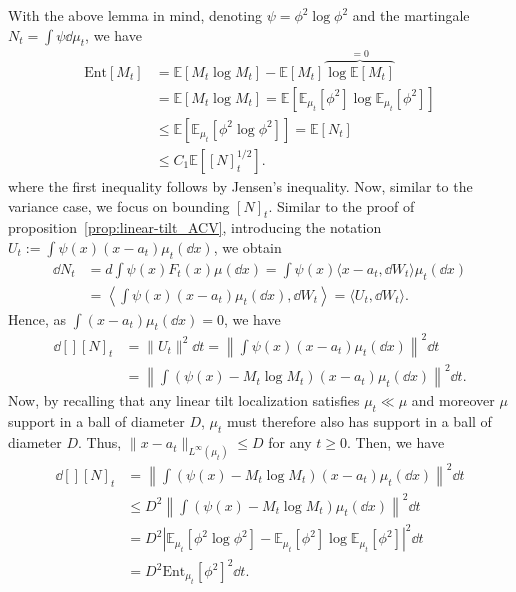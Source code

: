 With the above lemma in mind, denoting \(\psi = \phi^2 \log \phi^2\) and the martingale \(N_t = \int \psi \dd \mu_t\),
we have 
\begin{equation}\label{eq:entropy_bound}
  \begin{split}
    \text{Ent}[M_t] & = \mathbb{E}[M_t\log M_t] - \mathbb{E}[M_t]\overbrace{\log\mathbb{E}[M_t]}^{= 0}\\ 
      & = \mathbb{E}[M_t\log M_t] = \mathbb{E}[\mathbb{E}_{\mu_t}[\phi^2] \log\mathbb{E}_{\mu_t}[\phi^2]]\\
      & \le \mathbb{E}[\mathbb{E}_{\mu_t}[\phi^2 \log \phi^2]] = \mathbb{E}[N_t]\\ 
      & \le C_1 \mathbb{E}\left[[N]_t^{1 / 2}\right].
  \end{split}
\end{equation}
where the first inequality follows by Jensen's inequality. Now, similar to the variance case, we focus on 
bounding \([N]_t\). Similar to the proof of proposition~\ref{prop:linear-tilt_ACV}, introducing the notation  
\(U_t := \int \psi(x)(x - a_t)\mu_t(\dd x)\), we obtain
\begin{align*}
  \dd N_t & = d \int \psi(x) F_t(x) \mu(\dd x) = \int \psi(x) \langle x - a_t, \dd W_t \rangle \mu_t(\dd x)\\
  & = \left\langle \int \psi(x)(x - a_t)\mu_t(\dd x), \dd W_t\right\rangle = \langle U_t, \dd W_t\rangle.
\end{align*}
Hence, as \(\int (x - a_t) \mu_t(\dd x) = 0\), we have
\begin{align*}
  \dd[] [N]_t & = \|U_t\|^2 \dd t = \left\|\int \psi(x)(x - a_t)\mu_t(\dd x)\right\|^2 \dd t\\
  & = \left\|\int (\psi(x) - M_t \log M_t)(x - a_t)\mu_t(\dd x)\right\|^2 \dd t.
\end{align*}
Now, by recalling that any linear tilt localization satisfies \(\mu_t \ll \mu\) and moreover 
\(\mu\) support in a ball of diameter \(D\), \(\mu_t\) must therefore also has support in a ball of diameter \(D\). 
Thus, \(\|x - a_t\|_{L^\infty(\mu_t)} \le D\) for any \(t \ge 0\). Then, we have  
\begin{align*}
  \dd[] [N]_t & = \left\|\int (\psi(x) - M_t \log M_t)(x - a_t)\mu_t(\dd x)\right\|^2 \dd t\\
  & \le D^2 \left\|\int (\psi(x) - M_t \log M_t)\mu_t(\dd x)\right\|^2 \dd t\\
  & = D^2 \left|\mathbb{E}_{\mu_t}[\phi^2 \log \phi^2] - \mathbb{E}_{\mu_t}[\phi^2] \log\mathbb{E}_{\mu_t}[\phi^2]\right|^2 \dd t\\
  & = D^2 \text{Ent}_{\mu_t}[\phi^2]^2 \dd t.
\end{align*}
